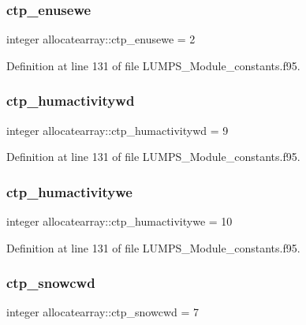 \subsubsection{\texorpdfstring{ctp\+\_\+enusewe}{ctp\_enusewe}}
{\footnotesize\ttfamily integer allocatearray\+::ctp\+\_\+enusewe = 2}



Definition at line 131 of file L\+U\+M\+P\+S\+\_\+\+Module\+\_\+constants.\+f95.

\mbox{\label{namespaceallocatearray_a6f461398489aaac2f0d3bbeccfaf9b50}} 
\subsubsection{\texorpdfstring{ctp\+\_\+humactivitywd}{ctp\_humactivitywd}}
{\footnotesize\ttfamily integer allocatearray\+::ctp\+\_\+humactivitywd = 9}



Definition at line 131 of file L\+U\+M\+P\+S\+\_\+\+Module\+\_\+constants.\+f95.

\mbox{\label{namespaceallocatearray_ac3cf90e10de86031186d0234e35581e2}} 
\subsubsection{\texorpdfstring{ctp\+\_\+humactivitywe}{ctp\_humactivitywe}}
{\footnotesize\ttfamily integer allocatearray\+::ctp\+\_\+humactivitywe = 10}



Definition at line 131 of file L\+U\+M\+P\+S\+\_\+\+Module\+\_\+constants.\+f95.

\mbox{\label{namespaceallocatearray_a71f069bc1dc0c9fbbd2f1d41c52e680e}} 
\subsubsection{\texorpdfstring{ctp\+\_\+snowcwd}{ctp\_snowcwd}}
{\footnotesize\ttfamily integer allocatearray\+::ctp\+\_\+snowcwd = 7}




